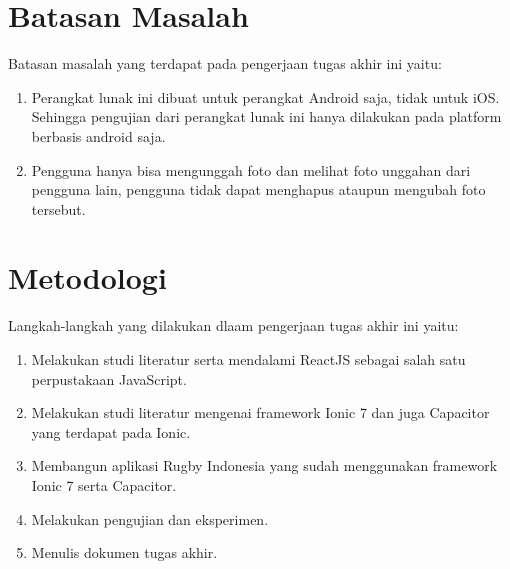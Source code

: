 
\section{Batasan Masalah}
\label{sec:batasan}
Batasan masalah yang terdapat pada pengerjaan tugas akhir ini yaitu:
\begin{enumerate}
    \item Perangkat lunak ini dibuat untuk perangkat Android saja, tidak untuk iOS. Sehingga pengujian dari perangkat lunak ini hanya dilakukan pada platform berbasis android saja.
    \item Pengguna hanya bisa mengunggah foto dan melihat foto unggahan dari pengguna lain, pengguna tidak dapat menghapus ataupun mengubah foto tersebut.
    
\end{enumerate}


\section{Metodologi}
\label{sec:metlit}
Langkah-langkah yang dilakukan dlaam pengerjaan tugas akhir ini yaitu:
\begin{enumerate}
    \item Melakukan studi literatur serta mendalami ReactJS sebagai salah satu perpustakaan JavaScript.
    \item Melakukan studi literatur mengenai framework Ionic 7 dan juga Capacitor yang terdapat pada Ionic.
    \item Membangun aplikasi Rugby Indonesia yang sudah menggunakan framework Ionic 7 serta Capacitor.
    \item Melakukan pengujian dan eksperimen.
    \item Menulis dokumen tugas akhir.
\end{enumerate}


